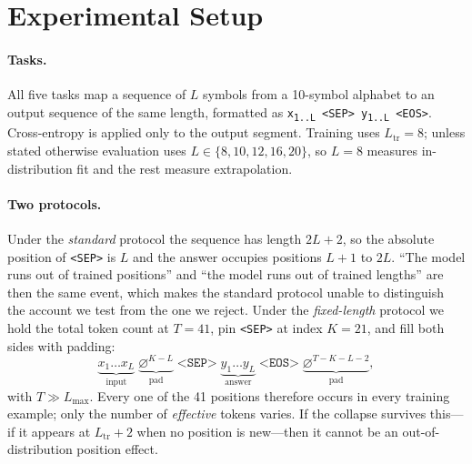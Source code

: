 \section{Experimental Setup}
\label{sec:setup}

\paragraph{Tasks.} All five tasks map a sequence of $L$ symbols from a
10-symbol alphabet to an output sequence of the same length, formatted as
\texttt{x\textsubscript{1..L} <SEP> y\textsubscript{1..L} <EOS>}. Cross-entropy
is applied only to the output segment. Training uses $L_{\mathrm{tr}}=8$; unless
stated otherwise evaluation uses $L\in\{8,10,12,16,20\}$, so $L{=}8$ measures
in-distribution fit and the rest measure extrapolation.

\paragraph{Two protocols.} Under the \emph{standard} protocol the sequence has
length $2L+2$, so the absolute position of \texttt{<SEP>} is $L$ and the answer
occupies positions $L{+}1$ to $2L$. ``The model runs out of trained positions''
and ``the model runs out of trained lengths'' are then the same event, which makes
the standard protocol unable to distinguish the account we test from the one we
reject. Under the \emph{fixed-length} protocol we hold the total token count at
$T{=}41$, pin \texttt{<SEP>} at index $K{=}21$, and fill both sides with padding:
\begin{equation}
\underbrace{x_1\ldots x_L}_{\text{input}}\;
\underbrace{\varnothing^{K-L}}_{\text{pad}}\;
\texttt{<SEP>}\;
\underbrace{y_1\ldots y_L}_{\text{answer}}\;
\texttt{<EOS>}\;
\underbrace{\varnothing^{T-K-L-2}}_{\text{pad}},
\label{eq:fixed}
\end{equation}
with $T\gg L_{\max}$. Every one of the 41 positions therefore occurs in every
training example; only the number of \emph{effective} tokens varies. If the
collapse survives this---if it appears at $L_{\mathrm{tr}}{+}2$ when no position is
new---then it cannot be an out-of-distribution position effect.

